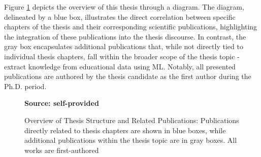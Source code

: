Figure \ref{fig:thesis_flow} depicts the overview of this thesis through a diagram. The diagram, delineated by a blue box, illustrates the direct correlation between specific chapters of the thesis and their corresponding scientific publications, highlighting the integration of these publications into the thesis discourse. In contrast, the gray box encapsulates additional publications that, while not directly tied to individual thesis chapters, fall within the broader scope of the thesis topic - extract knowledge from educational data using ML. Notably, all presented publications are authored by the thesis candidate as the first author during the Ph.D. period.

\begin{figure}[ht!]
\centering
\caption{\textmd{Overview of Thesis Structure and Related Publications: Publications directly related to thesis chapters are shown in blue boxes, while additional publications within the thesis topic are in gray boxes. All works are first-authored}}
\label{fig:thesis_flow}
\par\medskip\ABNTEXfontereduzida\selectfont\textbf{Source: self-provided}  
\par\medskip
\end{figure}